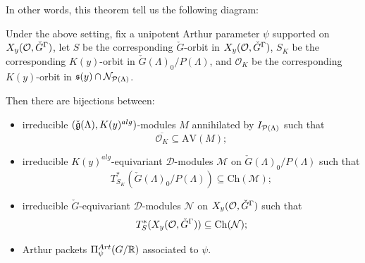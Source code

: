 \begin{rk}
  In other words, this theorem tell us the following diagram:
  \begin{center}
  \end{center}
\end{rk}


\begin{thm}
  Under the above setting, fix a unipotent Arthur parameter $\psi$ supported on $X_y(\mathcal{O},\check{G}^{\Gamma})$, let $S$ be the corresponding $\check{G}$-orbit in $X_y(\mathcal{O},\check{G}^{\Gamma})$, $S_K$ be the corresponding $K(y)$-orbit in $\check{G}(\Lambda)_0/P(\Lambda)$, and $\mathcal{O}_K$ be the corresponding $K(y)$-orbit in $\mathfrak{s}(y) \cap \mathcal{N}_{\mathcal{P}(\Lambda)}$.

  Then there are bijections between:
  \begin{itemize}
    \item irreducible $(\check{\mathfrak{g}}(\Lambda),K(y)^{alg})$-modules $M$ annihilated by $I_{\mathcal{P}(\Lambda)}$ such that
      \[
        \overline{\mathcal{O}_K} \subseteq \mathrm{AV}(M);
      \]
    \item irreducible $K(y)^{alg}$-equivariant $\mathcal{D}$-modules $\mathcal{M}$ on $\check{G}(\Lambda)_0/P(\Lambda)$ such that
      \[
        T^*_{S_K}(\check{G}(\Lambda)_0/P(\Lambda)) \subseteq \mathrm{Ch}(\mathcal{M});
      \]
    \item irreducible $\check{G}$-equivariant $\mathcal{D}$-modules $\mathcal{N}$ on $X_y(\mathcal{O},\check{G}^{\Gamma})$ such that
      \[
        T^*_{S}(X_y(\mathcal{O},\check{G}^{\Gamma})) \subseteq \mathrm{Ch}(\mathcal{N});
      \]
    \item Arthur packets $\Pi_{\psi}^{Art}(G/\mathbb{R})$ associated to $\psi$.
  \end{itemize}
\end{thm}



